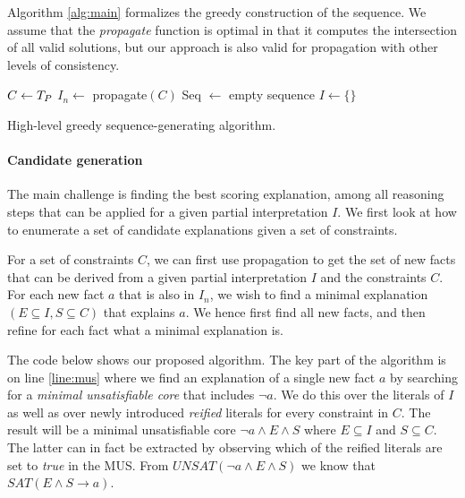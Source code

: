 Algorithm \ref{alg:main} formalizes the greedy construction of the sequence. We assume that the \textit{propagate} function is optimal in that it computes the intersection of all valid solutions, but our approach is also valid for propagation with other levels of consistency.

\begin{algorithm}
$C \gets T_P$\;
$I_n \gets$ propagate$(C)$\;
Seq $\gets$ empty sequence\;
$I \gets \{\}$\;
\caption{High-level greedy sequence-generating algorithm.}
\label{alg:main}
\end{algorithm}

\paragraph{Candidate generation}

The main challenge is finding the best scoring explanation, among all reasoning steps that can be applied for a given partial interpretation $I$. We first look at how to enumerate a set of candidate explanations given a set of constraints.

For a set of constraints $C$, we can first use propagation to get the set of new facts that can be derived from a given partial interpretation $I$ and the constraints $C$. For each new fact $a$ that is also in $I_n$, we wish to find a minimal explanation $(E \subseteq I, S \subseteq C)$ that explains $a$. We hence first find all new facts, and then refine for each fact what a minimal explanation is.

The code below shows our proposed algorithm. The key part of the algorithm is on line \ref{line:mus} where we find an explanation of a single new fact $a$ by searching for a \textit{minimal unsatisfiable core} that includes $\neg a$. We do this over the literals of $I$ as well as over newly introduced \textit{reified} literals for every constraint in $C$. The result will be a minimal unsatisfiable core $\neg a \wedge E \wedge S$ where $E \subseteq I$ and $S \subseteq C$. The latter can in fact be extracted by observing which of the reified literals are set to \textit{true} in the MUS. From $UNSAT(\neg a \wedge E \wedge S)$ we know that $SAT(E \wedge S \rightarrow a)$.

